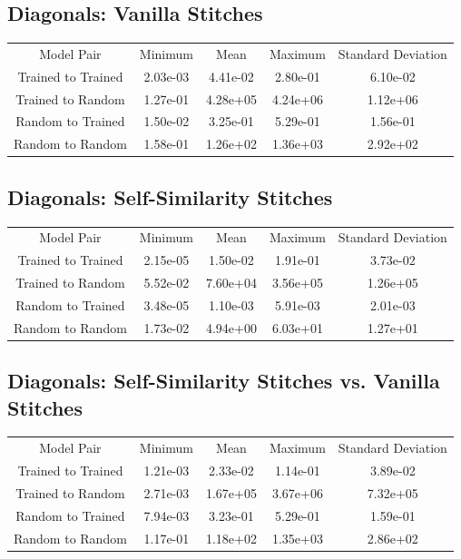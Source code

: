 \documentclass{article} %
\begin{document}
\subsection*{Diagonals: Vanilla Stitches}
\begin{tabular}{c c c c c}
   Model Pair&Minimum&Mean&Maximum&Standard Deviation\\
   Trained to Trained&2.03e-03&4.41e-02&2.80e-01&6.10e-02\\
   Trained to Random&1.27e-01&4.28e+05&4.24e+06&1.12e+06\\
   Random to Trained&1.50e-02&3.25e-01&5.29e-01&1.56e-01\\
   Random to Random&1.58e-01&1.26e+02&1.36e+03&2.92e+02\\
\end{tabular}

\subsection*{Diagonals: Self-Similarity Stitches}
\begin{tabular}{c c c c c}
   Model Pair&Minimum&Mean&Maximum&Standard Deviation\\
   Trained to Trained&2.15e-05&1.50e-02&1.91e-01&3.73e-02\\
   Trained to Random&5.52e-02&7.60e+04&3.56e+05&1.26e+05\\
   Random to Trained&3.48e-05&1.10e-03&5.91e-03&2.01e-03\\
   Random to Random&1.73e-02&4.94e+00&6.03e+01&1.27e+01\\
\end{tabular}

\subsection*{Diagonals: Self-Similarity Stitches vs. Vanilla Stitches}
\begin{tabular}{c c c c c}
   Model Pair&Minimum&Mean&Maximum&Standard Deviation\\
   Trained to Trained&1.21e-03&2.33e-02&1.14e-01&3.89e-02\\
   Trained to Random&2.71e-03&1.67e+05&3.67e+06&7.32e+05\\
   Random to Trained&7.94e-03&3.23e-01&5.29e-01&1.59e-01\\
   Random to Random&1.17e-01&1.18e+02&1.35e+03&2.86e+02\\
\end{tabular}
\end{document}
